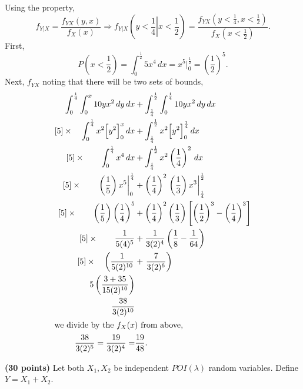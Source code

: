 \documentclass[12pt,letterpaper]{exam}
\begin{document}
\begin{questions}
	\begin{solution}
		Using the property,
		\[ f_{Y|X} = \frac{f_{YX}(y,x)}{f_X(x)} \Rightarrow f_{Y|X}\left(\left.y<\frac{1}{4}\right|x<\frac{1}{2}\right) = \frac{f_{YX}(y<\frac{1}{4},x<\frac{1}{2})}{f_X(x<\frac{1}{2})}. \]
		First,
		\[ P\left(x<\frac{1}{2}\right) = \int_{0}^{\frac{1}{2}} 5x^4 \,dx =  x^5 \Big|_{0}^\frac{1}{2} = \left(\frac{1}{2}\right)^5. \]
		Next, \(f_{YX}\) noting that there will be two sets of bounds,
		\begin{align*}
			\int_{0}^{\frac{1}{4}} \int_{0}^{x} 10yx^2\,dy\,dx	&+ \int_{\frac{1}{4}}^{\frac{1}{2}} \int_{0}^{\frac{1}{4}} 10yx^2\,dy\,dx \\
			\left[5\right]\times\quad  \int_{0}^{\frac{1}{4}} x^2 \Big[y^2\Big]_0^x \,dx	&+ \int_{\frac{1}{4}}^{\frac{1}{2}} x^2 \Big[y^2\Big]_0^\frac{1}{4} \,dx \\
			\left[5\right]\times\qquad  \int_{0}^{\frac{1}{4}} x^4 \,dx	&+ \int_{\frac{1}{4}}^{\frac{1}{2}} x^2 \left(\frac{1}{4}\right)^2 \,dx \\
			\left[5\right]\times\qquad \left.\left(\frac{1}{5}\right) x^5\right|_{0}^{\frac{1}{4}} 	
				&+	\left(\frac{1}{4}\right)^2 \left.\left(\frac{1}{3}\right)x^3\right|_{\frac{1}{4}}^{\frac{1}{2}}  \\
			\left[5\right]\times\qquad\left(\frac{1}{5}\right) \left(\frac{1}{4}\right)^5
			&+	\left(\frac{1}{4}\right)^2 \left(\frac{1}{3}\right) \left[ \left(\frac{1}{2}\right)^3 -\left(\frac{1}{4}\right)^3 \right]  \\
			\left[5\right]\times\qquad \frac{1}{5(4)^5} &+ \frac{1}{3(2)^4} \left( \frac{1}{8} - \frac{1}{64} \right) \\
			\left[5\right]\times\quad \left( \frac{1}{5(2)^{10}} \right. &+ \left. \frac{7}{3(2)^6} \right) \\
			5 \left( \frac{3+35}{15(2)^{10}} \right)& \\
			\frac{38}{3(2)^{10}} & \\
		\intertext{we divide by the \(f_X(x)\) from above,}
			\frac{38}{3(2)^{5}} = \frac{19}{3(2)^{4}} =& \frac{19}{48}. \\
		\end{align*}
		
	\end{solution} \clearpage

	\question 
	\textbf{(30 points)}  Let both \(X_1, X_2\) be independent \(POI(\lambda)\) random variables. Define \(Y = X_1 + X_2\).
	

\end{questions}
\end{document}
